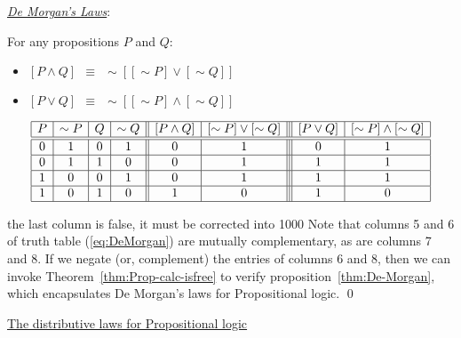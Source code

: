 \bigskip

\noindent 
\underline{\it De Morgan's Laws}:

\begin{prop}
\label{thm:De-Morgan}
For any propositions $P$ and $Q$:
\begin{itemize}
\item
$[ P \wedge Q ] \ \ \equiv \ \ \sim [ [\sim P] \vee [\sim Q]]$
\item
$[ P \vee Q ] \ \ \equiv \ \ \sim [ [\sim P] \wedge [\sim Q]]$
\end{itemize}
\end{prop}

\begin{equation}
\label{eq:DeMorgan}
\begin{array}{|c|c|c|c||c|c|||c|c|}
\hline
P & \sim P & Q & \sim Q 
  & [ P \wedge Q ]
  & [\sim P] \vee [\sim Q]
  & [ P \vee Q ]
  & [\sim P] \wedge [\sim Q] \\
\hline
\hline
0 & 1 & 0 & 1
  & 0
  & 1
  & 0
  & 1 \\
\hline
0 & 1 & 1 & 0
  & 0
  & 1
  & 1
  & 1 \\
\hline
1 & 0 & 0 & 1
  & 0
  & 1
  & 1
  & 1 \\
\hline
1 & 0 & 1 & 0
  & 1
  & 0
  & 1
  & 0 \\
\hline
\end{array}
\end{equation}

{\Denis the last column is false, it must be corrected into 1000}
Note that columns 5 and 6 of truth table (\ref{eq:DeMorgan}) are
mutually complementary, as are columns 7 and 8.  If we negate (or,
complement) the entries of columns 6 and 8, then we can invoke
Theorem~\ref{thm:Prop-calc-isfree} to verify
proposition~\ref{thm:De-Morgan}, which encapsulates De Morgan's laws
for Propositional logic.  \qed

\medskip

\noindent 
\underline{\small\sf The distributive laws for Propositional
  logic}


